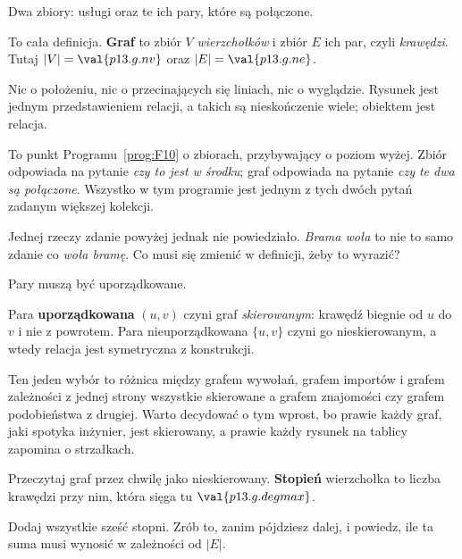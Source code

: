 \begin{fr}
\begin{ansblock}
Dwa zbiory: usługi oraz te ich pary, które są połączone.
\end{ansblock}

To cała definicja. \textbf{Graf} to zbiór $V$ \emph{wierzchołków} i zbiór $E$
ich par, czyli \emph{krawędzi}. Tutaj
$\lvert V \rvert = \val{p13.g.nv}$ oraz $\lvert E \rvert = \val{p13.g.ne}$.

Nic o położeniu, nic o przecinających się liniach, nic o wyglądzie. Rysunek
jest jednym przedstawieniem relacji, a takich są nieskończenie wiele; obiektem
jest relacja.

\begin{note}
To punkt Programu~\ref{prog:F10} o zbiorach, przybywający o poziom wyżej.
Zbiór odpowiada na pytanie \emph{czy to jest w środku}; graf odpowiada na
pytanie \emph{czy te dwa są połączone}. Wszystko w tym programie jest jednym z
tych dwóch pytań zadanym większej kolekcji.
\end{note}

Jednej rzeczy zdanie powyżej jednak nie powiedziało. \emph{Brama woła
} to nie to samo zdanie co \emph{ woła bramę}. Co musi
się zmienić w definicji, żeby to wyrazić?
\nextframe
\end{fr}

\begin{fr}
\begin{ansblock}
Pary muszą być uporządkowane.
\end{ansblock}

Para \textbf{uporządkowana} $(u, v)$ czyni graf \emph{skierowanym}: krawędź
biegnie od $u$ do $v$ i nie z powrotem. Para nieuporządkowana $\{u, v\}$ czyni
go nieskierowanym, a wtedy relacja jest symetryczna z konstrukcji.

Ten jeden wybór to różnica między grafem wywołań, grafem importów i grafem
zależności z jednej strony \dash{} wszystkie skierowane \dash{} a grafem
znajomości czy grafem podobieństwa z drugiej. Warto decydować o tym wprost, bo
prawie każdy graf, jaki spotyka inżynier, jest skierowany, a prawie każdy
rysunek na tablicy zapomina o strzałkach.

\end{fr}

\begin{fr}
Przeczytaj graf przez chwilę jako nieskierowany. \textbf{Stopień} wierzchołka
to liczba krawędzi przy nim, która sięga tu $\val{p13.g.degmax}$.

Dodaj wszystkie sześć stopni. Zrób to, zanim pójdziesz dalej, i powiedz, ile
ta suma musi wynosić w zależności od $\lvert E \rvert$.
\dotline
\nextframe
\end{fr}

